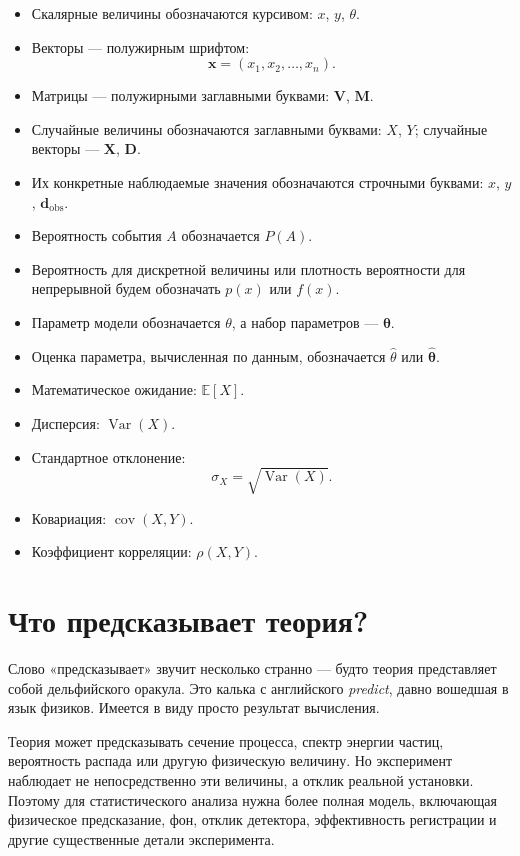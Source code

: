 \documentclass[
  russian,
  11pt,
  a4paper,
  open=any]{scrbook}
\providecommand{\tightlist}{%
  \setlength{\itemsep}{0pt}\setlength{\parskip}{0pt}}
\begin{document}
\begin{itemize}
\tightlist
\item
  Скалярные величины обозначаются курсивом: \(x\), \(y\), \(\theta\).
\item
  Векторы --- полужирным шрифтом: \[
  \mathbf{x}=(x_1,x_2,\dots,x_n).
  \]
\item
  Матрицы --- полужирными заглавными буквами: \(\mathbf V\),
  \(\mathbf M\).
\item
  Случайные величины обозначаются заглавными буквами: \(X\), \(Y\);
  случайные векторы --- \(\mathbf X\), \(\mathbf D\).
\item
  Их конкретные наблюдаемые значения обозначаются строчными буквами:
  \(x\), \(y\), \(\mathbf d_{\mathrm{obs}}\).
\item
  Вероятность события \(A\) обозначается \(P(A)\).
\item
  Вероятность для дискретной величины или плотность вероятности для
  непрерывной будем обозначать \(p(x)\) или \(f(x)\).
\item
  Параметр модели обозначается \(\theta\), а набор параметров ---
  \(\boldsymbol{\theta}\).
\item
  Оценка параметра, вычисленная по данным, обозначается
  \(\widehat{\theta}\) или \(\widehat{\boldsymbol{\theta}}\).
\item
  Математическое ожидание: \(\mathbb E[X]\).
\item
  Дисперсия: \(\operatorname{Var}(X)\).
\item
  Стандартное отклонение: \[
  \sigma_X=\sqrt{\operatorname{Var}(X)}.
  \]
\item
  Ковариация: \(\operatorname{cov}(X,Y)\).
\item
  Коэффициент корреляции: \(\rho(X,Y)\).
\end{itemize}

\section{Что предсказывает
теория?}\label{ux447ux442ux43e-ux43fux440ux435ux434ux441ux43aux430ux437ux44bux432ux430ux435ux442-ux442ux435ux43eux440ux438ux44f}

Слово «предсказывает» звучит несколько странно --- будто теория
представляет собой дельфийского оракула. Это калька с английского
\emph{predict}, давно вошедшая в язык физиков. Имеется в виду просто
результат вычисления.

Теория может предсказывать сечение процесса, спектр энергии частиц,
вероятность распада или другую физическую величину. Но эксперимент
наблюдает не непосредственно эти величины, а отклик реальной установки.
Поэтому для статистического анализа нужна более полная модель,
включающая физическое предсказание, фон, отклик детектора, эффективность
регистрации и другие существенные детали эксперимента.
\end{document}
